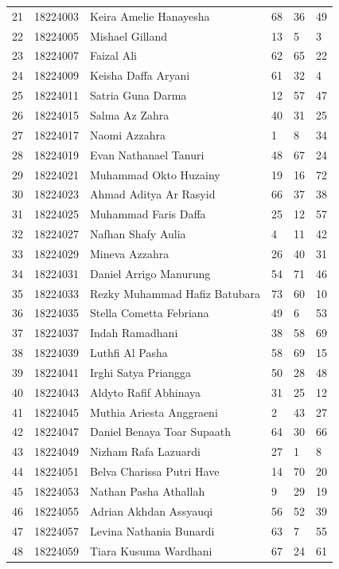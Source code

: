 \documentclass[
  letterpaper,
  DIV=11,
  numbers=noendperiod]{scrreprt}
\begin{document}
\begin{longtable}[]{@{}llllll@{}}
21 & 18224003 & Keira Amelie Hanayesha & 68 & 36 & 49 \\
22 & 18224005 & Mishael Gilland & 13 & 5 & 3 \\
23 & 18224007 & Faizal Ali & 62 & 65 & 22 \\
24 & 18224009 & Keisha Daffa Aryani & 61 & 32 & 4 \\
25 & 18224011 & Satria Guna Darma & 12 & 57 & 47 \\
26 & 18224015 & Salma Az Zahra & 40 & 31 & 25 \\
27 & 18224017 & Naomi Azzahra & 1 & 8 & 34 \\
28 & 18224019 & Evan Nathanael Tanuri & 48 & 67 & 24 \\
29 & 18224021 & Muhammad Okto Huzainy & 19 & 16 & 72 \\
30 & 18224023 & Ahmad Aditya Ar Rasyid & 66 & 37 & 38 \\
31 & 18224025 & Muhammad Faris Daffa & 25 & 12 & 57 \\
32 & 18224027 & Nafhan Shafy Aulia & 4 & 11 & 42 \\
33 & 18224029 & Mineva Azzahra & 26 & 40 & 31 \\
34 & 18224031 & Daniel Arrigo Manurung & 54 & 71 & 46 \\
35 & 18224033 & Rezky Muhammad Hafiz Batubara & 73 & 60 & 10 \\
36 & 18224035 & Stella Cometta Febriana & 49 & 6 & 53 \\
37 & 18224037 & Indah Ramadhani & 38 & 58 & 69 \\
38 & 18224039 & Luthfi Al Pasha & 58 & 69 & 15 \\
39 & 18224041 & Irghi Satya Priangga & 50 & 28 & 48 \\
40 & 18224043 & Aldyto Rafif Abhinaya & 31 & 25 & 12 \\
41 & 18224045 & Muthia Ariesta Anggraeni & 2 & 43 & 27 \\
42 & 18224047 & Daniel Benaya Toar Supaath & 64 & 30 & 66 \\
43 & 18224049 & Nizham Rafa Lazuardi & 27 & 1 & 8 \\
44 & 18224051 & Belva Charissa Putri Have & 14 & 70 & 20 \\
45 & 18224053 & Nathan Pasha Athallah & 9 & 29 & 19 \\
46 & 18224055 & Adrian Akhdan Assyauqi & 56 & 52 & 39 \\
47 & 18224057 & Levina Nathania Bunardi & 63 & 7 & 55 \\
48 & 18224059 & Tiara Kusuma Wardhani & 67 & 24 & 61 \\

\end{longtable}
\end{document}

